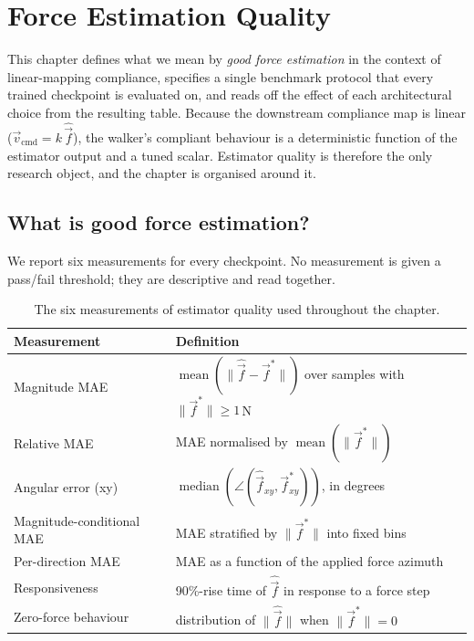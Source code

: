 \chapter{Force Estimation Quality}
\label{ch:evaluation}

This chapter defines what we mean by \emph{good force estimation} in the
context of linear-mapping compliance, specifies a single benchmark protocol
that every trained checkpoint is evaluated on, and reads off the effect of
each architectural choice from the resulting table. Because the downstream
compliance map is linear ($\vec{v}_{\text{cmd}} = k\,\hat{\vec{f}}$), the
walker's compliant behaviour is a deterministic function of the estimator
output and a tuned scalar. Estimator quality is therefore the only
research object, and the chapter is organised around it.

\section{What is good force estimation?}
\label{sec:eval_definitions}

We report six measurements for every checkpoint. No measurement is given a
pass/fail threshold; they are descriptive and read together.

\begin{table}[h]
\centering
\caption{The six measurements of estimator quality used throughout the chapter.}
\label{tab:eval_metrics}
\begin{tabular}{ll}
\hline
Measurement & Definition \\ \hline \hline
Magnitude MAE & $\operatorname{mean}\left(\|\hat{\vec{f}}-\vec{f}^{*}\|\right)$ over samples with $\|\vec{f}^{*}\|\ge 1\,$N \\
Relative MAE & MAE normalised by $\operatorname{mean}(\|\vec{f}^{*}\|)$ \\
Angular error (xy) & $\operatorname{median}\left(\angle(\hat{\vec{f}}_{xy},\vec{f}^{*}_{xy})\right)$, in degrees \\
Magnitude-conditional MAE & MAE stratified by $\|\vec{f}^{*}\|$ into fixed bins \\
Per-direction MAE & MAE as a function of the applied force azimuth \\
Responsiveness & 90\%-rise time of $\hat{\vec{f}}$ in response to a force step \\
Zero-force behaviour & distribution of $\|\hat{\vec{f}}\|$ when $\|\vec{f}^{*}\|=0$ \\
\hline
\end{tabular}
\end{table}

